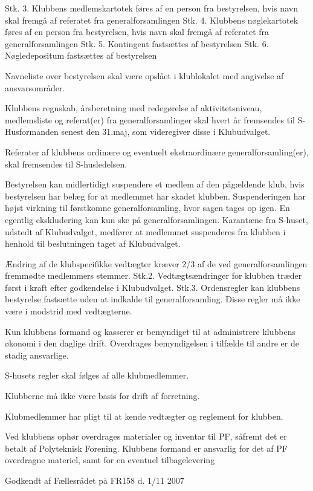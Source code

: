 \begin{list}
Stk. 3. Klubbens medlemskartotek føres af en person fra bestyrelsen, hvis navn skal fremgå af referatet fra
generalforsamlingen
Stk. 4. Klubbens nøglekartotek føres af en person fra bestyrelsen, hvis navn skal fremgå af referatet fra
generalforsamlingen
Stk. 5. Kontingent fastsættes af bestyrelsen
Stk. 6. Nøgledepositum fastsættes af bestyrelsen
\item Navneliste over bestyrelsen skal være opslået i klublokalet med angivelse af ansvarsområder.
\item Klubbens regnskab, årsberetning med redegørelse af aktivitetsniveau, medlemsliste og referat(er) fra
generalforsamlinger skal hvert år fremsendes til S-Husformanden senest den 31.maj, som videregiver disse i
Klubudvalget.
\item Referater af klubbens ordinære og eventuelt ekstraordinære generalforsamling(er), skal
fremsendes til S-husledelsen.
\item Bestyrelsen kan midlertidigt suspendere et medlem af den pågældende klub, hvis
bestyrelsen har belæg for at medlemmet har skadet klubben. Suspenderingen har højst virkning til førstkomne
generalforsamling, hvor sagen tages op igen. En egentlig ekskludering kan kun ske på generalforsamlingen.
Karantæne fra S-huset, udstedt af Klubudvalget, medfører at medlemmet suspenderes fra klubben i henhold til
beslutningen taget af Klubudvalget.
\item Ændring af de klubspecifikke vedtægter kræver 2/3 af de ved generalforsamlingen
fremmødte medlemmers stemmer.
Stk.2. Vedtægtsændringer for klubben træder først i kraft efter godkendelse i Klubudvalget.
Stk.3. Ordensregler kan klubbens bestyrelse fastsætte uden at indkalde til generalforsamling. Disse regler må
ikke være i modstrid med vedtægterne.
\item Kun klubbens formand og kasserer er bemyndiget til at administrere klubbens økonomi i
den daglige drift. Overdrages bemyndigelsen i tilfælde til andre er de stadig ansvarlige.
\item S-husets regler skal følges af alle klubmedlemmer.
\item Klubberne må ikke være basis for drift af forretning.
\item Klubmedlemmer har pligt til at kende vedtægter og reglement for klubben.
\item Ved klubbens ophør overdrages materialer og inventar til PF, såfremt det er betalt af
Polyteknisk Forening. Klubbens formand er ansvarlig for det af PF overdragne materiel, samt for en eventuel
tilbagelevering
\end{list}
Godkendt af Fællesrådet på FR158 d. 1/11 2007
